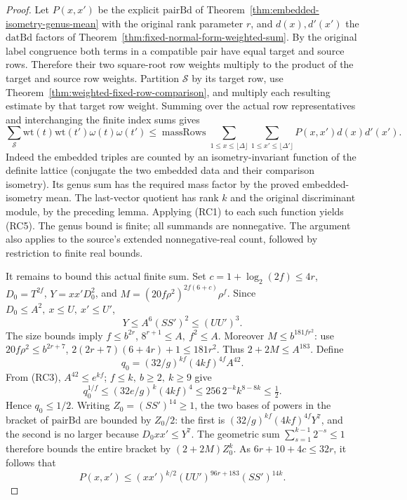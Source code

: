 \begin{proof}
Let \(P(x,x')\) be the explicit \(\mathrm{pairBd}\)
of Theorem~\ref{thm:embedded-isometry-genus-mean}
with the original rank parameter \(r\), and
\(d(x),d'(x')\) the \(\mathrm{datBd}\) factors of
Theorem~\ref{thm:fixed-normal-form-weighted-sum}.
By the original label congruence both terms in a
compatible pair have equal target and source rows.
Therefore their two square-root row weights multiply
to the product of the target and source row weights.
Partition \(\mathscr S\) by its target row, use
Theorem~\ref{thm:weighted-fixed-row-comparison}, and
multiply each resulting estimate by that target row
weight. Summing over the actual row representatives
and interchanging the finite index sums gives
\[
 \sum_{\mathscr S}\mathrm{wt}(t)\mathrm{wt}(t')
             \omega(t)\omega(t')
 \le \operatorname{massRows}
        \sum_{1\le x\le\lfloor\Delta\rfloor}
        \sum_{1\le x'\le\lfloor\Delta'\rfloor}
              P(x,x')d(x)d'(x').
 \tag{RC5}
\]
Indeed the embedded triples are counted by an
isometry-invariant function of the definite lattice
(conjugate the two embedded data and their comparison
isometry). Its genus sum has the required mass factor
by the proved embedded-isometry mean. The last-vector
quotient has rank \(k\) and the original discriminant
module, by the preceding lemma. Applying (RC1) to
each such function yields (RC5). The genus bound is
finite; all summands are nonnegative. The argument
also applies to the source's extended nonnegative-real
count, followed by restriction to finite real bounds.

It remains to bound this actual finite sum.
Set \(c=1+\log_2(2f)\le4r\),
\(D_0=T^{2f}\), \(Y=xx'D_0^2\), and
\(M=(20f\rho^2)^{2f(6+c)}\rho^f\).
Since \(D_0\le A^2,\ x\le U,\ x'\le U'\),
\[
 Y\le A^6(SS')^2\le (UU')^3 .
\]
The size bounds imply \(f\le b^{2r}\),
\(8^{r+1}\le A,\ f^2\le A\).
Moreover \(M\le b^{181fr^2}\): use
\(20f\rho^2\le b^{2r+7}\),
\(2(2r+7)(6+4r)+1\le181r^2\).
Thus \(2+2M\le A^{183}\).
Define
\[
 q_0=(32/g)^{kf}(4kf)^{4f}A^{42}.
\]
From (RC3), \(A^{42}\le e^{kf}\);
\(f\le k,\ b\ge2,\ k\ge9\) give
\[
 q_0^{1/f}\le (32e/g)^k (4kf)^4
       \le 256\,2^{-k} k^{8-8k}\le\tfrac12 .
\]
Hence \(q_0\le1/2\).
Writing \(Z_0=(SS')^{14}\ge1\), the two
bases of powers in the bracket of \(\mathrm{pairBd}\)
are bounded by \(Z_0/2\): the first is
\((32/g)^{kf}(4kf)^{4f}Y^7\), and the second is no
larger because \(D_0xx'\le Y^7\).
The geometric sum \(\sum_{s=1}^{k-1}2^{-s}\le1\)
therefore bounds the entire bracket by
\((2+2M)Z_0^k\).
As \(6r+10+4c\le32r\), it follows that
\[
 P(x,x')\le (xx')^{k/2}
       (UU')^{96r+183}(SS')^{14k}.
 \tag{RC6}
\]


\end{proof}
